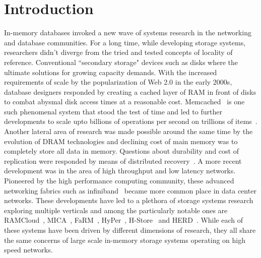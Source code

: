 
\chapter{Introduction}
In-memory databases invoked a new wave of systems research in the 
networking and database communities. For a long time, while developing storage
systems, researchers didn't diverge from the  tried and tested concepts of
locality of reference. Conventional ``secondary storage" devices
such as disks where the ultimate solutions for growing capacity demands. With the 
increased requirements of scale by the popularization of Web 2.0 in the early 2000s, 
database designers responded by creating a cached layer of RAM in front of disks
to combat abysmal disk access times at a reasonable cost. Memcached~\cite{memcached-orig}
is one such phenomenal system that stood the test of time and led to further developments
to scale upto billions of operations per second on trillions of items~\cite{nishtala2013scaling}.
Another lateral area of research was made possible around the same time by the 
evolution of DRAM technologies and declining cost of main memory was to completely
store all data in memory. Questions about durability and cost of replication 
were responded by means of distributed recovery~\cite{ongaro2011fast}. 
A more recent development was in the area of high throughput and low latency networks. 
Pioneered by the high performance computing community, these advanced networking fabrics 
such as infiniband~\cite{pfister2001introduction} became more common place in 
data center networks. These developments have led to a plethora of storage systems research 
exploring multiple verticals and among the particularly notable ones are RAMCloud~\cite{ramcloud},
MICA~\cite{mica}, FaRM~\cite{farm}, HyPer~\cite{hyper}, H-Store~\cite{hstore} 
and HERD~\cite{herd}. While each of these systems have been driven by different dimensions 
of research, they all share the same concerns of large scale in-memory storage systems 
operating on high speed networks.



